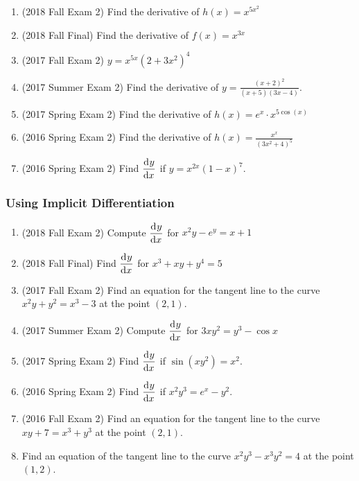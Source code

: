 \documentclass[10pt]{scrartcl}
\begin{document}
\begin{enumerate}
\item (2018 Fall Exam 2) Find the derivative of $h(x) = x^{5x^2}$
\item (2018 Fall Final) Find the derivative of $f(x) = x^{3x}$
\item (2017 Fall Exam 2) $y = x^{5x}(2 + 3x^2)^4$
\item (2017 Summer Exam 2) Find the derivative of $y = \frac{(x+2)^2}{(x+5)(3x-4)}$.
\item (2017 Spring Exam 2) Find the derivative of $h(x) = e^x \cdot x^{5\cos(x)}$
\item (2016 Spring Exam 2) Find the derivative of $h(x) = \frac{x^x}{(3x^2+4)^5}$
\item (2016 Spring Exam 2) Find $\dod yx$ if $y = x^{2x}(1-x)^7$.
\end{enumerate}

\subsubsection{Using Implicit Differentiation}
\begin{enumerate}
\item (2018 Fall Exam 2) Compute $\dod{y}{x}$ for $x^2y - e^y = x + 1$
\item (2018 Fall Final) Find $\dod{y}{x}$ for $x^3 + xy + y^4 = 5$
\item (2017 Fall Exam 2) Find an equation for the tangent line to the curve $x^2 y + y^2 = x^3 - 3$ at the point $(2, 1)$.
\item (2017 Summer Exam 2) Compute $\dod{y}{x}$ for $3xy^2 = y^3 - \cos x$
\item (2017 Spring Exam 2) Find $\dod{y}{x}$ if $\sin(xy^2) = x^2$.
\item (2016 Spring Exam 2) Find $\dod yx$ if $x^2y^3 = e^x - y^2$. 
\item (2016 Fall Exam 2) Find an equation for the tangent line to the curve $xy + 7 = x^3 + y^3$ at the point $(2, 1)$.
\item Find an equation of the tangent line to the curve $x^2 y^3 - x^3 y^2 = 4$ at the point $(1, 2)$. 

\end{enumerate}
\end{document}
